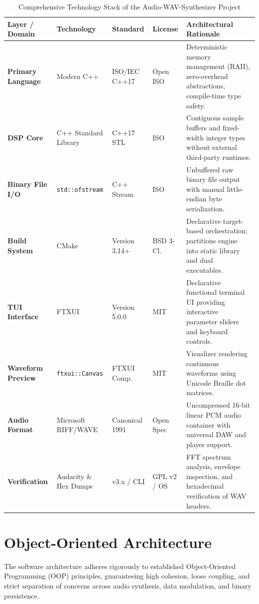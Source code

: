 \documentclass[12pt,a4paper,oneside]{book}
\begin{document}
\begin{table}[htbp]
\centering
\caption{Comprehensive Technology Stack of the Audio-WAV-Synthesizer Project}
\label{tab:tech_stack}
\footnotesize
\setlength{\tabcolsep}{5pt}
\begin{tabular}{@{}p{2.4cm}p{2.6cm}p{2.1cm}p{1.6cm}p{6.5cm}@{}}
\toprule
\textbf{Layer / Domain} & \textbf{Technology} & \textbf{Standard} & \textbf{License} & \textbf{Architectural Rationale} \\ \midrule
\textbf{Primary Language} & Modern C++ & ISO/IEC C++17 & Open ISO & Deterministic memory management (RAII), zero-overhead abstractions, compile-time type safety. \\
\textbf{DSP Core} & C++ Standard Library & C++17 STL & ISO & Contiguous sample buffers and fixed-width integer types without external third-party runtimes. \\
\textbf{Binary File I/O} & \texttt{std::ofstream} & C++ Stream & ISO & Unbuffered raw binary file output with manual little-endian byte serialization. \\
\textbf{Build System} & CMake & Version 3.14+ & BSD 3-Cl. & Declarative target-based orchestration; partitions engine into static library and dual executables. \\
\textbf{TUI Interface} & FTXUI & Version 5.0.0 & MIT & Declarative functional terminal UI providing interactive parameter sliders and keyboard controls. \\
\textbf{Waveform Preview} & \texttt{ftxui::Canvas} & FTXUI Comp. & MIT & Visualizer rendering continuous waveforms using Unicode Braille dot matrices. \\
\textbf{Audio Format} & Microsoft RIFF/WAVE & Canonical 1991 & Open Spec & Uncompressed 16-bit linear PCM audio container with universal DAW and player support. \\
\textbf{Verification} & Audacity \& Hex Dumps & v3.x / CLI & GPL v2 / OS & FFT spectrum analysis, envelope inspection, and hexadecimal verification of WAV headers. \\
\bottomrule
\end{tabular}
\end{table}

\FloatBarrier

\section{Object-Oriented Architecture}
The software architecture adheres rigorously to established Object-Oriented Programming (OOP) principles, guaranteeing high cohesion, loose coupling, and strict separation of concerns across audio synthesis, data modulation, and binary persistence.
\end{document}
